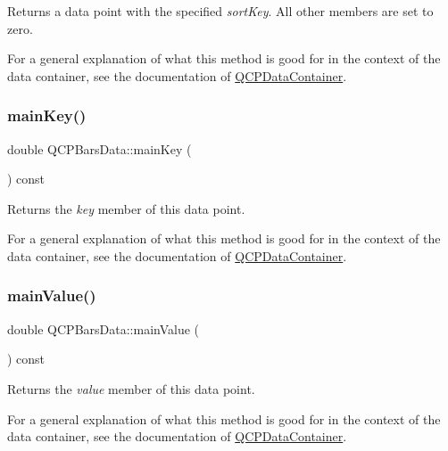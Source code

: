 Returns a data point with the specified {\itshape sort\+Key}. All other members are set to zero.

For a general explanation of what this method is good for in the context of the data container, see the documentation of \hyperlink{class_q_c_p_data_container}{Q\+C\+P\+Data\+Container}. \mbox{\label{class_q_c_p_bars_data_a8c1d09e63b0e90a6c1fba56ddeaa8964}} 
\subsubsection{\texorpdfstring{main\+Key()}{mainKey()}}
{\footnotesize\ttfamily double Q\+C\+P\+Bars\+Data\+::main\+Key (\begin{DoxyParamCaption}{ }\end{DoxyParamCaption}) const\hspace{0.3cm}{\ttfamily [inline]}}

Returns the {\itshape key} member of this data point.

For a general explanation of what this method is good for in the context of the data container, see the documentation of \hyperlink{class_q_c_p_data_container}{Q\+C\+P\+Data\+Container}. \mbox{\label{class_q_c_p_bars_data_a360d975e587f9e84259aaec172efb10b}} 
\subsubsection{\texorpdfstring{main\+Value()}{mainValue()}}
{\footnotesize\ttfamily double Q\+C\+P\+Bars\+Data\+::main\+Value (\begin{DoxyParamCaption}{ }\end{DoxyParamCaption}) const\hspace{0.3cm}{\ttfamily [inline]}}

Returns the {\itshape value} member of this data point.

For a general explanation of what this method is good for in the context of the data container, see the documentation of \hyperlink{class_q_c_p_data_container}{Q\+C\+P\+Data\+Container}. \mbox{\label{class_q_c_p_bars_data_a107d22d84f336bf6e3c3ad0133a5d2f6}} 
